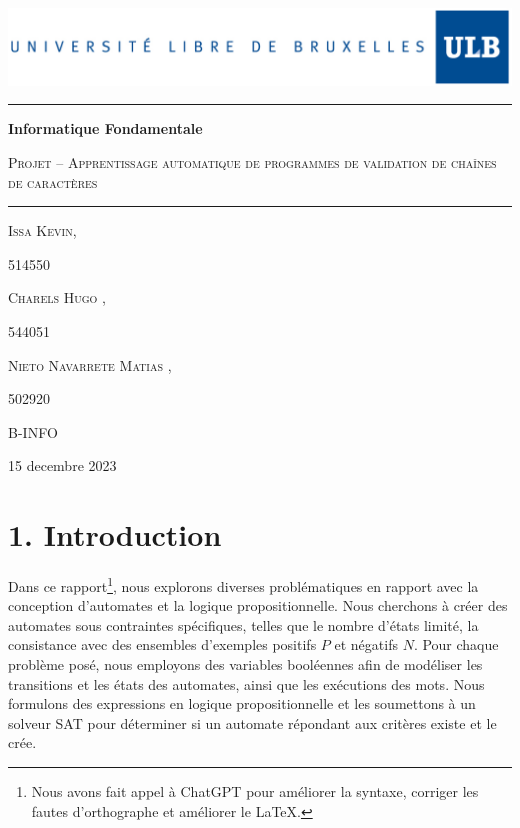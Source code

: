 \documentclass[french]{article}
\begin{document}
\begin{titlepage}
	\centering
    \includegraphics[width=1\textwidth]{log.jpg}
    \vspace{2.5cm} 
    
    \noindent\rule{15cm}{0.4pt}
    \vspace{0.25cm} 
    {\huge\bfseries Informatique Fondamentale \par}
    \vspace{0.5cm}
    {\scshape\Large Projet – Apprentissage automatique de programmes de validation de chaînes de caractères \par}
    \vspace{0.5cm}
    \noindent\rule{15cm}{0.4pt}
    \vfill


    {\Large\scshape Issa Kevin, }
	{\Large\scshape 514550\par}
	{\Large\scshape Charels Hugo , }
    {\Large\scshape 544051\par}
    {\Large\scshape Nieto Navarrete Matias , }
    {\Large\scshape 502920\par}
	\vspace{0.5cm}
	{\Large\scshape B-INFO\par}
	\vspace{1cm}
	{\large 15 decembre 2023\par}
\end{titlepage}


\tableofcontents
\clearpage

\section*{1. Introduction}

Dans ce rapport\footnote{Nous avons fait appel à ChatGPT pour améliorer la syntaxe, corriger les fautes d'orthographe et améliorer le \LaTeX.}, nous explorons diverses problématiques en rapport avec la conception d'automates et la logique propositionnelle. Nous cherchons à créer des automates sous contraintes spécifiques, telles que le nombre d'états limité, la consistance avec des ensembles d'exemples positifs \( P \) et négatifs \( N \). Pour chaque problème posé, nous employons des variables booléennes afin de modéliser les transitions et les états des automates, ainsi que les exécutions des mots. Nous formulons des expressions en logique propositionnelle et les soumettons à un solveur SAT pour déterminer si un automate répondant aux critères existe et le crée.
\end{document}
